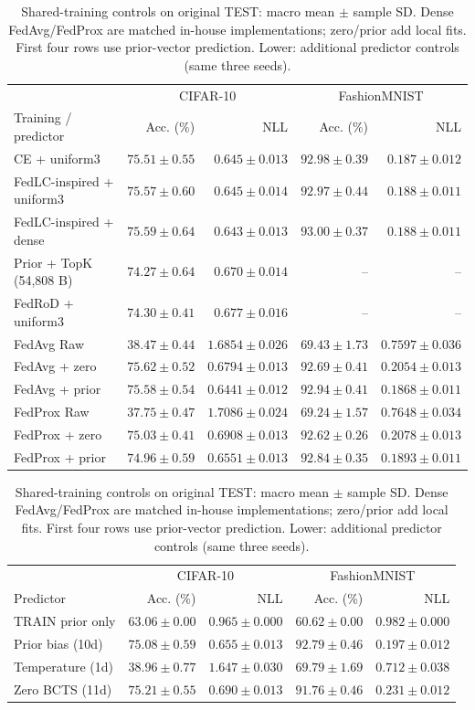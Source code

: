 \begin{table}[!htb]\centering\small\setlength{\tabcolsep}{0.4pt}
\caption{Shared-training controls on original TEST: macro mean $\pm$ sample SD. Dense FedAvg/FedProx are matched in-house implementations; zero/prior add local fits. First four rows use prior-vector prediction. Lower: additional predictor controls (same three seeds).}\label{tab:training}\label{tab:reference}\label{tab:dense_baselines}\label{tab:full}
\begin{tabular}{lrrrr}\toprule
& \multicolumn{2}{c}{CIFAR-10} & \multicolumn{2}{c}{FashionMNIST}\\
Training / predictor & Acc. (\%) & NLL & Acc. (\%) & NLL\\\midrule
CE + uniform3 & $75.51\pm0.55$ & $0.645\pm0.013$ & $92.98\pm0.39$ & $0.187\pm0.012$\\
FedLC-inspired + uniform3 & $75.57\pm0.60$ & $0.645\pm0.014$ & $92.97\pm0.44$ & $0.188\pm0.011$\\
FedLC-inspired + dense & $75.59\pm0.64$ & $0.643\pm0.013$ & $93.00\pm0.37$ & $0.188\pm0.011$\\\midrule
Prior + TopK (54,808 B) & $74.27\pm0.64$ & $0.670\pm0.014$ & -- & --\\
FedRoD + uniform3 & $74.30\pm0.41$ & $0.677\pm0.016$ & -- & --\\\midrule
FedAvg Raw & $38.47 \pm 0.44$ & $1.6854 \pm 0.026$ & $69.43 \pm 1.73$ & $0.7597 \pm 0.036$\\
FedAvg + zero & $75.62 \pm 0.52$ & $0.6794 \pm 0.013$ & $92.69 \pm 0.41$ & $0.2054 \pm 0.013$\\
FedAvg + prior & $75.58 \pm 0.54$ & $0.6441 \pm 0.012$ & $92.94 \pm 0.41$ & $0.1868 \pm 0.011$\\
FedProx Raw & $37.75 \pm 0.47$ & $1.7086 \pm 0.024$ & $69.24 \pm 1.57$ & $0.7648 \pm 0.034$\\
FedProx + zero & $75.03 \pm 0.41$ & $0.6908 \pm 0.013$ & $92.62 \pm 0.26$ & $0.2078 \pm 0.013$\\
FedProx + prior & $74.96 \pm 0.59$ & $0.6551 \pm 0.013$ & $92.84 \pm 0.35$ & $0.1893 \pm 0.011$\\
\bottomrule
\end{tabular}
\par\medskip
\begin{tabular}{lrrrr}\toprule
& \multicolumn{2}{c}{CIFAR-10} & \multicolumn{2}{c}{FashionMNIST}\\
Predictor & Acc. (\%) & NLL & Acc. (\%) & NLL\\\midrule
TRAIN prior only & $63.06\pm0.00$ & $0.965\pm0.000$ & $60.62\pm0.00$ & $0.982\pm0.000$\\
Prior bias (10d) & $75.08\pm0.59$ & $0.655\pm0.013$ & $92.79\pm0.46$ & $0.197\pm0.012$\\
Temperature (1d) & $38.96\pm0.77$ & $1.647\pm0.030$ & $69.79\pm1.69$ & $0.712\pm0.038$\\
Zero BCTS (11d) & $75.21\pm0.55$ & $0.690\pm0.013$ & $91.76\pm0.46$ & $0.231\pm0.012$\\
\bottomrule
\end{tabular}
\end{table}
